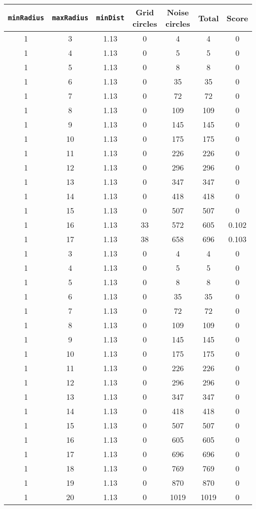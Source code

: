 \documentclass[letterpaper, 12pt]{article}
\begin{document}
\begin{longtable}{|c|c|c|c|c|c|c|}
\hline
\textbf{\texttt{minRadius}} & \textbf{\texttt{maxRadius}} & \textbf{\texttt{minDist}} & \textbf{Grid circles} & \textbf{Noise circles} & \textbf{Total} & \textbf{Score} \\
\hline
1 & 3 & 1.13 & 0 & 4 & 4 & 0 \\
\hline
1 & 4 & 1.13 & 0 & 5 & 5 & 0 \\
\hline
1 & 5 & 1.13 & 0 & 8 & 8 & 0 \\
\hline
1 & 6 & 1.13 & 0 & 35 & 35 & 0 \\
\hline
1 & 7 & 1.13 & 0 & 72 & 72 & 0 \\
\hline
1 & 8 & 1.13 & 0 & 109 & 109 & 0 \\
\hline
1 & 9 & 1.13 & 0 & 145 & 145 & 0 \\
\hline
1 & 10 & 1.13 & 0 & 175 & 175 & 0 \\
\hline
1 & 11 & 1.13 & 0 & 226 & 226 & 0 \\
\hline
1 & 12 & 1.13 & 0 & 296 & 296 & 0 \\
\hline
1 & 13 & 1.13 & 0 & 347 & 347 & 0 \\
\hline
1 & 14 & 1.13 & 0 & 418 & 418 & 0 \\
\hline
1 & 15 & 1.13 & 0 & 507 & 507 & 0 \\
\hline
1 & 16 & 1.13 & 33 & 572 & 605 & 0.102 \\
\hline
1 & 17 & 1.13 & 38 & 658 & 696 & 0.103 \\
\hline
1 & 3 & 1.13 & 0 & 4 & 4 & 0 \\
\hline
1 & 4 & 1.13 & 0 & 5 & 5 & 0 \\
\hline
1 & 5 & 1.13 & 0 & 8 & 8 & 0 \\
\hline
1 & 6 & 1.13 & 0 & 35 & 35 & 0 \\
\hline
1 & 7 & 1.13 & 0 & 72 & 72 & 0 \\
\hline
1 & 8 & 1.13 & 0 & 109 & 109 & 0 \\
\hline
1 & 9 & 1.13 & 0 & 145 & 145 & 0 \\
\hline
1 & 10 & 1.13 & 0 & 175 & 175 & 0 \\
\hline
1 & 11 & 1.13 & 0 & 226 & 226 & 0 \\
\hline
1 & 12 & 1.13 & 0 & 296 & 296 & 0 \\
\hline
1 & 13 & 1.13 & 0 & 347 & 347 & 0 \\
\hline
1 & 14 & 1.13 & 0 & 418 & 418 & 0 \\
\hline
1 & 15 & 1.13 & 0 & 507 & 507 & 0 \\
\hline
1 & 16 & 1.13 & 0 & 605 & 605 & 0 \\
\hline
1 & 17 & 1.13 & 0 & 696 & 696 & 0 \\
\hline
1 & 18 & 1.13 & 0 & 769 & 769 & 0 \\
\hline
1 & 19 & 1.13 & 0 & 870 & 870 & 0 \\
\hline
1 & 20 & 1.13 & 0 & 1019 & 1019 & 0 \\
\hline
\end{longtable}
\end{document}
